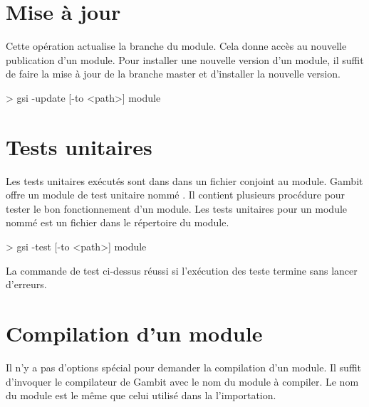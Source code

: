 \section{Mise à jour}
Cette opération actualise la branche  du module.
Cela donne accès au nouvelle publication d'un module. Pour installer
une nouvelle version d'un module, il suffit de faire la mise à jour
de la branche master et d'installer la nouvelle version.

\begin{center}
  \begin{mplisting}{0.8}
> gsi -update [-to <path>] module
\end{mplisting}
\end{center}

\section{Tests unitaires}
Les tests unitaires exécutés sont dans dans un fichier conjoint au module.
Gambit offre un module de test unitaire nommé . Il
contient plusieurs procédure pour tester le bon fonctionnement d'un module.
Les tests unitaires pour un module nommé  est un fichier
 dans le répertoire du module.

\begin{center}
  \begin{mplisting}{0.8}
> gsi -test [-to <path>] module
\end{mplisting}
\end{center}

La commande de test ci-dessus réussi si l'exécution des teste termine sans
lancer d'erreurs.


\section{Compilation d'un module}
Il n'y a pas d'options spécial pour demander la compilation d'un module.
Il suffit d'invoquer le compilateur de Gambit avec le nom du module
à compiler. Le nom du module est le même que celui utilisé dans la
l'importation.




